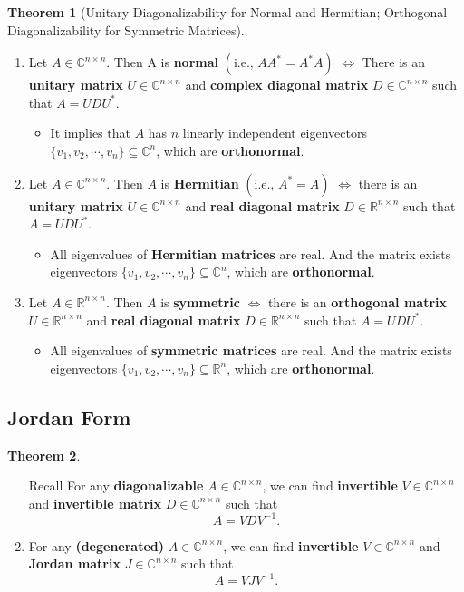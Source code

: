 \documentclass{article}
\theoremstyle{definition}
\newtheorem{theorem}{Theorem}[section]
\numberwithin{theorem}{section}
\numberwithin{equation}{section}
\begin{document}
\begin{theorem}[Unitary Diagonalizability for Normal and Hermitian; Orthogonal Diagonalizability for Symmetric Matrices]
    \begin{enumerate}
\item Let $A \in \mathbb{C}^{n \times n}$. Then A is \textbf{normal} $( \text{i.e., } AA^*=A^*A)$ $\Leftrightarrow$ There is an \textbf{unitary matrix} $U\in \mathbb{C}^{n \times n}$ and
  \textbf{complex diagonal matrix} $D\in \mathbb{C}^{n \times n}$ such that $A = UDU^*$.
  \begin{itemize}
  \item It implies that $A$ has $n$ linearly independent eigenvectors $\{v_1,v_2,\cdots,v_n \}\subseteq \mathbb{C}^n$, which are  \textbf{orthonormal}.
  \end{itemize}
\item Let $A \in \mathbb{C}^{n \times n}$. Then $A$ is \textbf{Hermitian} $( \text{i.e., } A^*=A)$ $\Leftrightarrow$ there is an \textbf{unitary matrix} $U\in \mathbb{C}^{n \times n}$ and \textbf{real diagonal matrix} $D\in \mathbb{R}^{n \times n}$ such that $A = UDU^*$.
  \begin{itemize}
  \item All eigenvalues of \textbf{Hermitian matrices} are real. And the matrix exists eigenvectors    $\{v_1,v_2,\cdots,v_n \}\subseteq \mathbb{C}^n$, which are \textbf{orthonormal}.
  \end{itemize}
\item Let $A \in \mathbb{R}^{n \times n}$. Then $A$ is \textbf{symmetric} $\Leftrightarrow$ there is an \textbf{orthogonal matrix} $U\in \mathbb{R}^{n \times n}$ and \textbf{real diagonal matrix} $D\in \mathbb{R}^{n \times n}$ such that $A = UDU^*$.
  \begin{itemize}
  \item All eigenvalues of \textbf{symmetric matrices} are real. And the matrix exists eigenvectors $\{v_1,v_2,\cdots,v_n \}\subseteq \mathbb{R}^n$, which are  \textbf{orthonormal}.
  \end{itemize}
\end{enumerate}
\end{theorem}


\subsection{Jordan Form}

\begin{theorem}
    \begin{enumerate}
\item [Recall] For any \textbf{diagonalizable} $A \in \mathbb{C}^{n \times n}$, we can find \textbf{invertible} $V\in \mathbb{C}^{n \times n}$ and \textbf{invertible matrix} $D\in \mathbb{C}^{n \times n}$ such that
\[
A= VDV^{-1}.
\]
\item  For any \textbf{(degenerated)} $A \in \mathbb{C}^{n \times n}$, we can find \textbf{invertible} $V\in \mathbb{C}^{n \times n}$ and \textbf{Jordan matrix} $J\in \mathbb{C}^{n \times n}$ such that
\[
A= VJV^{-1}.
\]
\end{enumerate}
\end{theorem}
\end{document}
